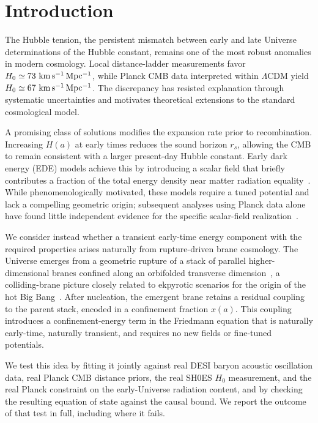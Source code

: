 \documentclass[11pt,a4paper,twocolumn]{article}
\begin{document}
\section{Introduction}
The Hubble tension, the persistent mismatch between early and late Universe determinations of the Hubble constant, remains one of the most robust anomalies in modern cosmology. Local distance-ladder measurements favor $H_0 \simeq 73\ {\rm km\,s^{-1}\,Mpc^{-1}}$, while Planck CMB data interpreted within $\Lambda$CDM yield $H_0 \simeq 67\ {\rm km\,s^{-1}\,Mpc^{-1}}$. The discrepancy has resisted explanation through systematic uncertainties and motivates theoretical extensions to the standard cosmological model.

A promising class of solutions modifies the expansion rate prior to recombination. Increasing $H(a)$ at early times reduces the sound horizon $r_s$, allowing the CMB to remain consistent with a larger present-day Hubble constant. Early dark energy (EDE) models achieve this by introducing a scalar field that briefly contributes a fraction of the total energy density near matter radiation equality~\cite{poulin2019}. While phenomenologically motivated, these models require a tuned potential and lack a compelling geometric origin; subsequent analyses using Planck data alone have found little independent evidence for the specific scalar-field realization~\cite{hill2020}.

We consider instead whether a transient early-time energy component with the required properties arises naturally from rupture-driven brane cosmology. The Universe emerges from a geometric rupture of a stack of parallel higher-dimensional branes confined along an orbifolded transverse dimension~\cite{horava1996}, a colliding-brane picture closely related to ekpyrotic scenarios for the origin of the hot Big Bang~\cite{khoury2001}. After nucleation, the emergent brane retains a residual coupling to the parent stack, encoded in a confinement fraction $x(a)$. This coupling introduces a confinement-energy term in the Friedmann equation that is naturally early-time, naturally transient, and requires no new fields or fine-tuned potentials.

We test this idea by fitting it jointly against real DESI baryon acoustic oscillation data, real Planck CMB distance priors, the real SH0ES $H_0$ measurement, and the real Planck constraint on the early-Universe radiation content, and by checking the resulting equation of state against the causal bound. We report the outcome of that test in full, including where it fails.
\end{document}
